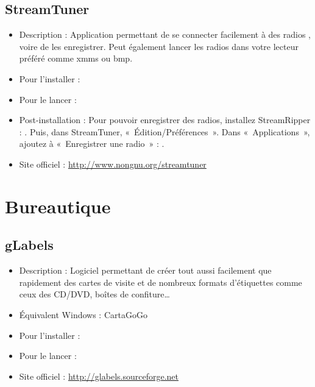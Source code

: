 \subsection{StreamTuner}
\begin{itemize}
\begingroup
{}
\item Description : Application permettant de se connecter facilement à des radios , voire de les enregistrer. Peut également lancer les radios dans votre lecteur préféré comme xmms ou bmp.{\par}
\item Pour l'installer : 
\item Pour le lancer : 
\endgroup
\item Post-installation : Pour pouvoir enregistrer des radios, installez StreamRipper : . Puis, dans StreamTuner, «~Édition/Préférences~». Dans «~Applications~», ajoutez à «~Enregistrer une radio~» : .{\par}
\item Site officiel : \url{http://www.nongnu.org/streamtuner}{\par}
\end{itemize}
\section{Bureautique}
\subsection{gLabels}
\begin{itemize}
\begingroup
{}
\item Description : Logiciel permettant de créer tout aussi facilement que rapidement des cartes de visite et de nombreux formats d'étiquettes comme ceux des CD/DVD, boîtes de confiture\ldots{}{\par}
\item Équivalent Windows : CartaGoGo{\par}
\item Pour l'installer : 
\item Pour le lancer : 
\item Site officiel : \url{http://glabels.sourceforge.net}{\par}
\endgroup
\end{itemize}
